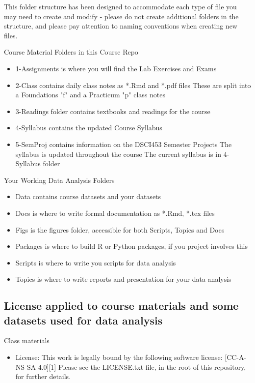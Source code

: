 \documentclass[10pt]{article} %
\begin{document}
    This folder structure has been designed to accommodate each type of file you may need to create and modify - please do not create additional folders in the structure, and please pay attention to naming conventions when creating new files.

    Course Material Folders in this Course Repo
    \begin{itemize}
      \item 1-Assignments is where you will find the Lab Exercises and Exams
      \item 2-Class contains daily class notes as *.Rmd and *.pdf files
      \subitem These are split into a Foundations "f" and a Practicum "p" class notes
      \item 3-Readings folder contains textbooks and readings for the course
      \item 4-Syllabus contains the updated Course Syllabus
      \item 5-SemProj contains information on the DSCI453 Semester Projects
      \subitem The syllabus is updated throughout the course
      \subitem The current syllabus is in 4-Syllabus folder
    \end{itemize}

    Your Working Data Analysis Folders
    \begin{itemize}
      \item Data contains course datasets and your datasets
      \item Docs is where to write formal documentation as *.Rmd, *.tex files
      \item Figs is the figures folder, accessible for both Scripts, Topics and Docs
      \item Packages is where to build R or Python packages, if you project involves this
      \item Scripts is where to write you scripts for data analysis
      \item Topics is where to write reports and presentation for your data analysis
    \end{itemize}

  \subsection{License applied to course materials and some datasets used for data analysis}

    Class materials
    \begin{itemize}
      \item License: This work is legally bound by the following software license: [CC-A-NS-SA-4.0][1]
      \subitem Please see the LICENSE.txt file, in the root of this repository, for further details.
    \end{itemize}
\end{document}
